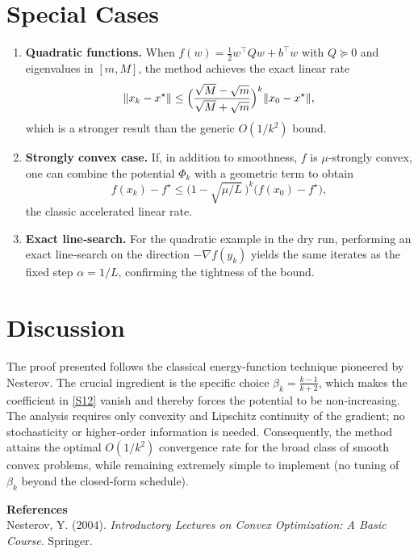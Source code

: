 \documentclass{article}
\begin{document}
\section*{Special Cases}
\begin{enumerate}[label=\alph*)]
\item \textbf{Quadratic functions.} When \(f(w)=\frac12 w^{\top}Qw+b^{\top}w\) with \(Q\succeq 0\) and eigenvalues in \([m,M]\), the method achieves the exact linear rate
\[
\|x_k-x^\star\|\le \Bigl(\frac{\sqrt{M}-\sqrt{m}}{\sqrt{M}+\sqrt{m}}\Bigr)^{k}\|x_0-x^\star\|,
\]
which is a stronger result than the generic \(O(1/k^{2})\) bound.

\item \textbf{Strongly convex case.} If, in addition to smoothness, \(f\) is \(\mu\)-strongly convex, one can combine the potential \(\Phi_k\) with a geometric term to obtain
\[
f(x_k)-f^\star \le \bigl(1-\sqrt{\mu/L}\,\bigr)^{k}\bigl(f(x_0)-f^\star\bigr),
\]
the classic accelerated linear rate.

\item \textbf{Exact line‑search.} For the quadratic example in the dry run, performing an exact line‑search on the direction \(-\nabla f(y_k)\) yields the same iterates as the fixed step \(\alpha=1/L\), confirming the tightness of the bound.
\end{enumerate}

\section*{Discussion}
The proof presented follows the classical energy‑function technique pioneered by Nesterov. The crucial ingredient is the specific choice \(\beta_k=\frac{k-1}{k+2}\), which makes the coefficient in \eqref{S12} vanish and thereby forces the potential to be non‑increasing. The analysis requires only convexity and Lipschitz continuity of the gradient; no stochasticity or higher‑order information is needed. Consequently, the method attains the optimal \(O(1/k^{2})\) convergence rate for the broad class of smooth convex problems, while remaining extremely simple to implement (no tuning of \(\beta_k\) beyond the closed‑form schedule).

\bigskip

\noindent\textbf{References}\\
Nesterov, Y. (2004). \emph{Introductory Lectures on Convex Optimization: A Basic Course}. Springer.
\end{document}
